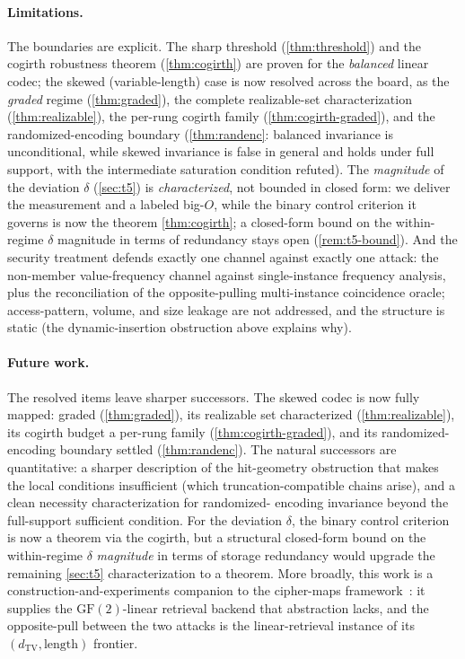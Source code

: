 \documentclass[sigconf,nonacm,anonymous,balance=false]{acmart}
\newcommand{\TV}{d_{\mathrm{TV}}}
\newcommand{\GF}{\mathrm{GF}(2)}
\begin{document}
\paragraph{Limitations.}
The boundaries are explicit. The sharp threshold (\cref{thm:threshold}) and the cogirth
robustness theorem (\cref{thm:cogirth}) are proven for the \emph{balanced} linear codec; the
skewed (variable-length) case is now resolved across the board, as the \emph{graded} regime
(\cref{thm:graded}), the complete realizable-set characterization (\cref{thm:realizable}), the
per-rung cogirth family (\cref{thm:cogirth-graded}), and the randomized-encoding boundary
(\cref{thm:randenc}: balanced invariance is unconditional, while skewed invariance is false in
general and holds under full support, with the intermediate saturation condition refuted). The \emph{magnitude} of the deviation
$\delta$ (\cref{sec:t5}) is \emph{characterized}, not bounded in closed form: we deliver the
measurement and a labeled big-$O$, while the binary control criterion it governs is now the
theorem \cref{thm:cogirth}; a closed-form bound on the within-regime $\delta$ magnitude in
terms of redundancy stays open (\cref{rem:t5-bound}). And the security treatment defends
exactly one channel against exactly one attack: the non-member value-frequency channel against
single-instance frequency analysis, plus the reconciliation of the opposite-pulling
multi-instance coincidence oracle; access-pattern, volume, and size leakage are not addressed,
and the structure is static (the dynamic-insertion obstruction above explains why).

\paragraph{Future work.}
The resolved items leave sharper successors. The skewed codec is now fully mapped: graded
(\cref{thm:graded}), its realizable set characterized (\cref{thm:realizable}), its cogirth
budget a per-rung family (\cref{thm:cogirth-graded}), and its randomized-encoding boundary
settled (\cref{thm:randenc}). The natural successors are quantitative: a sharper description of
the hit-geometry obstruction that makes the local conditions insufficient (which
truncation-compatible chains arise), and a clean necessity characterization for randomized-
encoding invariance beyond the full-support sufficient condition. For the
deviation $\delta$, the binary control criterion is now a theorem via the cogirth, but a
structural closed-form bound on the within-regime $\delta$ \emph{magnitude} in terms of storage
redundancy would upgrade the remaining \cref{sec:t5} characterization to a theorem. More
broadly, this work is a construction-and-experiments companion to the cipher-maps
framework~\cite{towell2026ciphermaps}: it supplies the $\GF$-linear retrieval backend that
abstraction lacks, and the opposite-pull between the two attacks is the linear-retrieval
instance of its $(\TV, \text{length})$ frontier.
\end{document}

